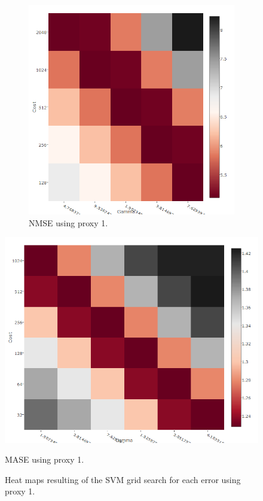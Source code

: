 \begin{center}
\begin{figure}[!h]
{\begin{subfigure}{.55\linewidth}
  \includegraphics[width=\linewidth, height = 0.32\textheight]{img/6mNMSEsigma.png}
  \caption{NMSE using proxy 1.}
  \label{fig:heat2}
\end{subfigure}}
  \centering
  \includegraphics[width=0.6\linewidth, height = 0.34\textheight]{img/6mMASEsigma.png}
  \caption{MASE using proxy 1.}
  \label{fig:heat3}
\caption{Heat maps resulting of the SVM grid search for each error using proxy 1.}
\label{fig:heat6mp1}
\end{figure}\end{center}
